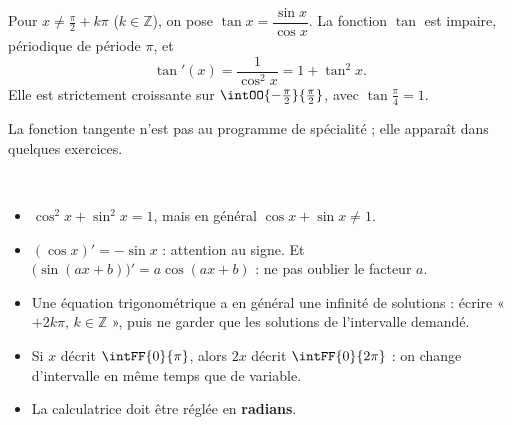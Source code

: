 \noindent
\begin{minipage}[c]{0.55\linewidth}
\raggedright
\begin{definition}
\raggedright
Pour $x\neq\frac{\pi}{2}+k\pi$ ($k\in\mathbb{Z}$), on pose $\tan x=\dfrac{\sin x}{\cos x}$. La fonction $\tan$ est impaire,
périodique de période $\pi$, et
\[ \tan'(x)=\frac{1}{\cos^{2}x}=1+\tan^{2}x. \]
Elle est strictement croissante sur $\intOO{-\frac{\pi}{2}}{\frac{\pi}{2}}$, avec $\tan\frac{\pi}{4}=1$.
\end{definition}
{\small\color{otMuted}La fonction tangente n'est pas au programme de spécialité ; elle apparaît dans quelques exercices.}
\end{minipage}\hfill
\begin{minipage}[c]{0.41\linewidth}
\centering
{}\\[0.5mm]
\end{minipage}

\begin{attention}
\begin{itemize}[label={\color{otOrange}\textbullet},leftmargin=1.4em,itemsep=0.6mm,topsep=0.5mm]
  \item $\cos^{2}x+\sin^{2}x=1$, mais en général $\cos x+\sin x\neq1$.
  \item $(\cos x)'=-\sin x$ : attention au signe. Et $\big(\sin(ax+b)\big)'=a\cos(ax+b)$ : ne pas oublier le facteur $a$.
  \item Une équation trigonométrique a en général une infinité de solutions : écrire « $+2k\pi$, $k\in\mathbb{Z}$ », puis ne
    garder que les solutions de l'intervalle demandé.
  \item Si $x$ décrit $\intFF{0}{\pi}$, alors $2x$ décrit $\intFF{0}{2\pi}$ : on change d'intervalle en même temps que de variable.
  \item La calculatrice doit être réglée en \textbf{radians}.
\end{itemize}
\end{attention}

